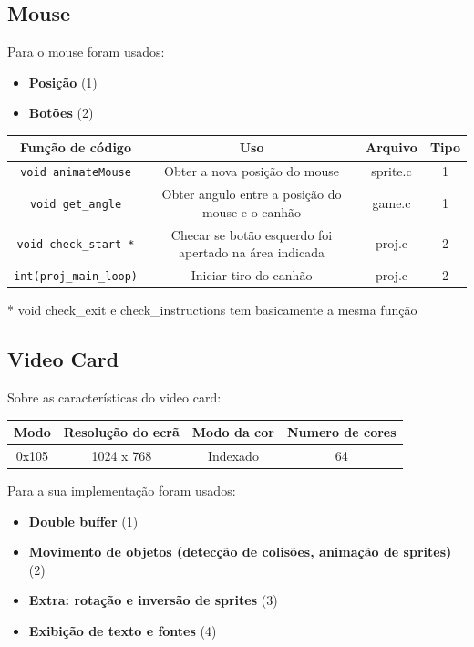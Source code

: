 \documentclass[12pt]{article}
\begin{document}
\subsection{Mouse}
Para o mouse foram usados:
\begin{itemize}
    \item \textbf{Posição} (1)
    \item \textbf{Botões} (2)
\end{itemize}
\begin{center}
    \begin{tabular}{|c|c|c|c|}
        \hline
        Função de código& Uso & Arquivo & Tipo\\
        \hline
        \texttt{void animateMouse}& Obter a nova posição do mouse & sprite.c & 1 \\
        \texttt{void get\_angle} & Obter angulo entre a posição do mouse e o canhão & game.c & 1 \\
        \texttt{void check\_start *} & Checar se botão esquerdo foi apertado na área indicada & proj.c & 2 \\
        \texttt{int(proj\_main\_loop)} & Iniciar tiro do canhão & proj.c& 2\\
        \hline
    \end{tabular}
    \small{* void check\_exit e check\_instructions tem basicamente a mesma função}
\end{center}
\subsection{Video Card}
Sobre as características do video card: 
\newline
\begin{center}
    \begin{tabular}{|c|c|c|c|}
        \hline
        Modo & Resolução do ecrã & Modo da cor & Numero de cores\\
        \hline
        0x105 & 1024 x 768 & Indexado & 64\\ 
        \hline
    \end{tabular}
\end{center}
Para a sua implementação foram usados: 
\begin{itemize}
    \item \textbf{Double buffer} (1)
    \item \textbf{Movimento de objetos (detecção de colisões, animação de sprites)} (2)
    \item \textbf{Extra: rotação e inversão de sprites} (3)
    \item \textbf{Exibição de texto e fontes} (4) 
\end{itemize}
\end{document}
